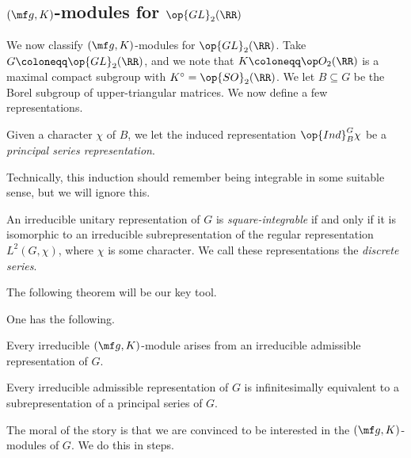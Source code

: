 \documentclass{article}
\begin{document}
\subsection{\texorpdfstring{$(\mf g,K)$}{(g, K)}-modules for \texorpdfstring{$\op{GL}_2(\RR)$}{GL2(R)}}
We now classify $(\mf g,K)$-modules for $\op{GL}_2(\RR)$. Take $G\coloneqq\op{GL}_2(\RR)$, and we note that $K\coloneqq\op O_2(\RR)$ is a maximal compact subgroup with $K^\circ=\op{SO}_2(\RR)$. We let $B\subseteq G$ be the Borel subgroup of upper-triangular matrices. We now define a few representations.
\begin{definition}
	Given a character $\chi$ of $B$, we let the induced representation $\op{Ind}_B^G\chi$ be a \textit{principal series representation}.
\end{definition}
\begin{remark}
	Technically, this induction should remember being integrable in some suitable sense, but we will ignore this.
\end{remark}
\begin{definition}
	An irreducible unitary representation of $G$ is \textit{square-integrable} if and only if it is isomorphic to an irreducible subrepresentation of the regular representation $L^2(G,\chi)$, where $\chi$ is some character. We call these representations the \textit{discrete series}.
\end{definition}
The following theorem will be our key tool.
\begin{theorem}[subrepresentation]
	One has the following.
	\begin{listalph}
		\item Every irreducible $(\mf g,K)$-module arises from an irreducible admissible representation of $G$.
		\item Every irreducible admissible representation of $G$ is infinitesimally equivalent to a subrepresentation of a principal series of $G$.
	\end{listalph}
\end{theorem}
The moral of the story is that we are convinced to be interested in the $(\mf g,K)$-modules of $G$. We do this in steps.
\end{document}
